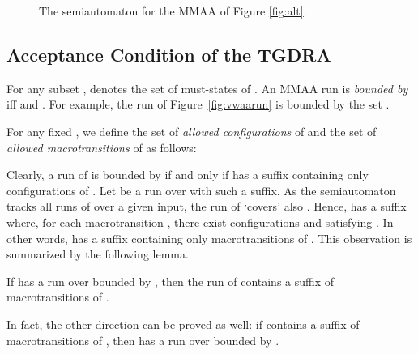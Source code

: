 \documentclass{llncs}
\begin{document}
		  


    




\begin{figure}[t]
  \centering
    
\caption{The semiautomaton  for the MMAA of Figure \ref{fig:alt}.}
  \label{fig:ts}
\end{figure}





\subsection{Acceptance Condition  of the TGDRA }
For any subset ,  denotes the set of must-states
of . An MMAA run  is \emph{bounded by}  iff  and .  For example, the run of
Figure~\ref{fig:vwaarun} is bounded by the set .

For any fixed , we define the set  of
\emph{allowed configurations} of  and the set  of \emph{allowed macrotransitions} of  as follows:

  Clearly, a run  of  is
bounded by  if and only if  has a suffix containing only
configurations of . Let  be a run over  with such a
suffix. As the semiautomaton  tracks all runs of  over a given
input, the run  of  `covers' also . Hence, 
has a suffix where, for each macrotransition , there
exist configurations  and 
satisfying . In other words,  has a
suffix containing only macrotransitions of .  This observation is
summarized by the following lemma.
\begin{lemma}\label{lem:aux}
  If  has a run over  bounded by , then the run  of
   contains a suffix of macrotransitions of .
\end{lemma}
In fact, the other direction can be proved as well: if  contains
a suffix of macrotransitions of , then  has a run over 
bounded by .
\end{document}
